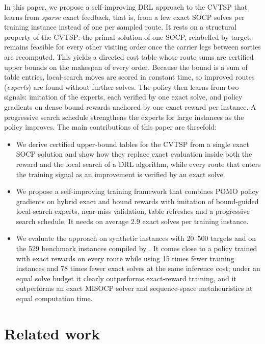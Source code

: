 \documentclass[preprint,review,12pt,authoryear]{elsarticle}
\begin{document}
In this paper, we propose a self-improving DRL approach to the CVTSP that learns from \emph{sparse} exact
feedback, that is, from a few exact SOCP solves per training instance instead of one per sampled route. It
rests on a structural property of the CVTSP: the primal solution of one SOCP, relabelled by target, remains
feasible for every other visiting order once the carrier legs between sorties are recomputed. This yields a
directed cost table whose route sums are certified upper bounds on the makespan of every order. Because the
bound is a sum of table entries, local-search moves are scored in constant time, so improved routes
(\emph{experts}) are found without further solves. The policy then learns from two signals: imitation of
the experts, each verified by one exact solve, and policy gradients on dense bound rewards anchored by one
exact reward per instance. A progressive search schedule strengthens the experts for large instances as the
policy improves. The main contributions of this paper are threefold:
\begin{itemize}
\item We derive certified upper-bound tables for the CVTSP from a single exact SOCP solution and show how they
replace exact evaluation inside both the reward and the local search of a DRL algorithm, while every route that
enters the training signal as an improvement is verified by an exact solve.
\item We propose a self-improving training framework that combines POMO policy gradients on hybrid exact and bound
rewards with imitation of bound-guided local-search experts, near-miss validation, table refreshes and a
progressive search schedule. It needs on average 2.9 exact solves per training instance.
\item We evaluate the approach on synthetic instances with 20--500 targets and on the 529 benchmark instances
compiled by \citet{li2025exact}. It comes close to a policy trained with exact rewards on every route while
using 15 times fewer training instances and 78 times fewer exact solves at the same inference cost; under an
equal solve budget it clearly outperforms exact-reward training, and it outperforms an exact MISOCP solver and
sequence-space metaheuristics at equal computation time.
\end{itemize}

\section{Related work}\label{sec:lit}
\end{document}
